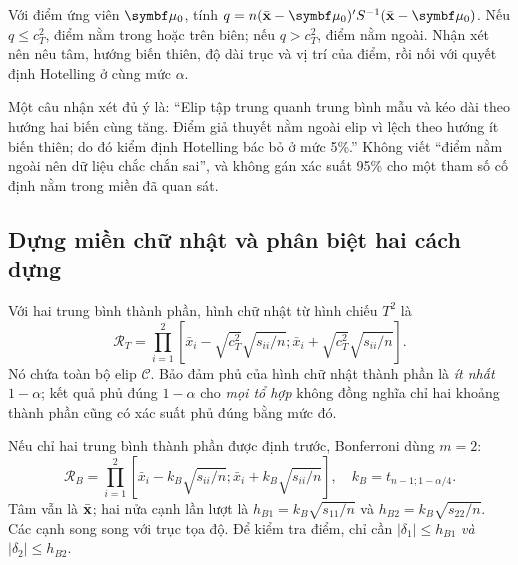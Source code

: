 Với điểm ứng viên $\vmu_0$, tính
$q=n(\xbar-\vmu_0)'S^{-1}(\xbar-\vmu_0)$.
Nếu $q\le c_T^2$, điểm nằm trong hoặc trên biên; nếu $q>c_T^2$, điểm
nằm ngoài. Nhận xét nên nêu tâm, hướng biến thiên, độ dài trục và vị trí
của điểm, rồi nối với quyết định Hotelling ở cùng mức $\alpha$.

Một câu nhận xét đủ ý là: ``Elip tập trung quanh trung bình mẫu và kéo
dài theo hướng hai biến cùng tăng. Điểm giả thuyết nằm ngoài elip vì lệch
theo hướng ít biến thiên; do đó kiểm định Hotelling bác bỏ ở mức 5\%.''
Không viết ``điểm nằm ngoài nên dữ liệu chắc chắn sai'', và không gán
xác suất 95\% cho một tham số cố định nằm trong miền đã quan sát.

\subsection{Dựng miền chữ nhật và phân biệt hai cách dựng}
\label{sec:rectangles}
Với hai trung bình thành phần, hình chữ nhật từ hình chiếu $T^2$ là
\begin{equation}
 \mathcal R_T=\prod_{i=1}^2
 \left[\bar x_i-\sqrt{c_T^2}\sqrt{s_{ii}/n};
 \bar x_i+\sqrt{c_T^2}\sqrt{s_{ii}/n}\right].
 \label{eq:rectangle_T}
\end{equation}
Nó chứa toàn bộ elip $\mathcal C$. Bảo đảm phủ của hình chữ nhật thành
phần là \emph{ít nhất} $1-\alpha$; kết quả phủ đúng $1-\alpha$ cho
\emph{mọi tổ hợp} không đồng nghĩa chỉ hai khoảng thành phần cũng có
xác suất phủ đúng bằng mức đó.

Nếu chỉ hai trung bình thành phần được định trước, Bonferroni dùng $m=2$:
\begin{equation}
 \mathcal R_B=\prod_{i=1}^2
 \left[\bar x_i-k_B\sqrt{s_{ii}/n};
 \bar x_i+k_B\sqrt{s_{ii}/n}\right],\quad
 k_B=t_{n-1;1-\alpha/4}.
 \label{eq:rectangle_B}
\end{equation}
Tâm vẫn là $\bar{\mathbf x}$; hai nửa cạnh lần lượt là
$h_{B1}=k_B\sqrt{s_{11}/n}$ và $h_{B2}=k_B\sqrt{s_{22}/n}$.
Các cạnh song song với trục tọa độ. Để kiểm tra điểm, chỉ cần
$|\delta_1|\le h_{B1}$ \emph{và} $|\delta_2|\le h_{B2}$.


